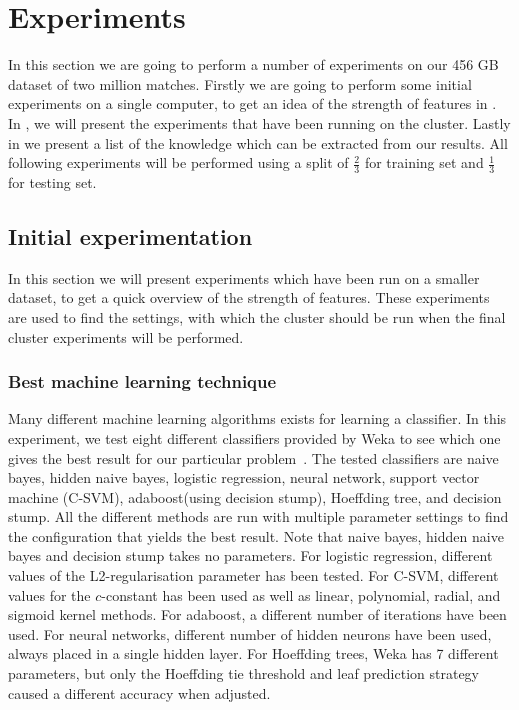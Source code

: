 \section{Experiments}\label{sec:testing}
In this section we are going to perform a number of experiments on our 456 GB dataset of two million matches. Firstly we are going to perform some initial experiments on a single computer, to get an idea of the strength of features in . In , we will present the experiments that have been running on the cluster. Lastly in  we present a list of the knowledge which can be extracted from our results. All following experiments will be performed using a split of $\frac{2}{3}$ for training set and $\frac{1}{3}$ for testing set. 

\subsection{Initial experimentation}\label{sec:initialtest}
In this section we will present experiments which have been run on a smaller dataset, to get a quick overview of the strength of features. 
These experiments are used to find the settings, with which the cluster should be run when the final cluster experiments will be performed. 

\subsubsection{Best machine learning technique}
Many different machine learning algorithms exists for learning a classifier. In this experiment, we test eight different classifiers provided by Weka to see which one gives the best result for our particular problem~\cite{weka}. 
The tested classifiers are naive bayes, hidden naive bayes, logistic regression, neural network, support vector machine (C-SVM), adaboost(using decision stump), Hoeffding tree, and decision stump. 
All the different methods are run with multiple parameter settings to find the configuration that yields the best result. 
Note that naive bayes, hidden naive bayes and decision stump takes no parameters. 
For logistic regression, different values of the L2-regularisation parameter has been tested. 
For C-SVM, different values for the $c$-constant has been used as well as linear, polynomial, radial, and sigmoid kernel methods. 
For adaboost, a different number of iterations have been used. For neural networks, different number of hidden neurons have been used, always placed in a single hidden layer. 
For Hoeffding trees, Weka has 7 different parameters, but only the Hoeffding tie threshold and leaf prediction strategy caused a different accuracy when adjusted.


